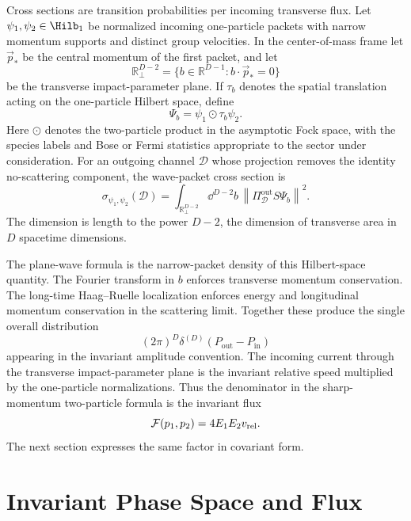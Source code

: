 Cross sections are transition probabilities per incoming transverse flux.
Let \(\psi_1,\psi_2\in\Hilb_1\) be normalized incoming one-particle packets
with narrow momentum supports and distinct group velocities.  In the
center-of-mass frame let \(\vec p_*\) be the central momentum of the first
packet, and let
\[
  \mathbb R^{D-2}_\perp
  =
  \{b\in\mathbb R^{D-1}: b\cdot \vec p_*=0\}
\]
be the transverse impact-parameter plane.  If \(\tau_b\) denotes the spatial
translation acting on the one-particle Hilbert space, define
\[
  \Psi_b=\psi_1\odot \tau_b\psi_2 .
\]
Here \(\odot\) denotes the two-particle product in the asymptotic Fock space,
with the species labels and Bose or Fermi statistics appropriate to the
sector under consideration.  For an outgoing channel \(\mathcal D\) whose
projection removes the identity no-scattering component, the wave-packet
cross section is
\[
  \sigma_{\psi_1,\psi_2}(\mathcal D)
  =
  \int_{\mathbb R^{D-2}_\perp}\dd^{D-2}b\,
  \left\|
    \Pi_{\mathcal D}^{\mathrm{out}}S\Psi_b
  \right\|^2 .
\]
The dimension is length to the power \(D-2\), the dimension of transverse
area in \(D\) spacetime dimensions.

The plane-wave formula is the narrow-packet density of this Hilbert-space
quantity.  The Fourier transform in \(b\) enforces transverse momentum
conservation.  The long-time Haag--Ruelle localization enforces energy and
longitudinal momentum conservation in the scattering limit.  Together these
produce the single overall distribution
\[
  (2\pi)^D\delta^{(D)}(P_{\mathrm{out}}-P_{\mathrm{in}})
\]
appearing in the invariant amplitude convention.  The incoming current
through the transverse impact-parameter plane is the invariant relative speed
multiplied by the one-particle normalizations.  Thus the denominator in the
sharp-momentum two-particle formula is the invariant flux
\[
  \mathcal F(p_1,p_2)=4E_1E_2v_{\rm rel}.
\]
The next section expresses the same factor in covariant form.

\section{Invariant Phase Space and Flux}

